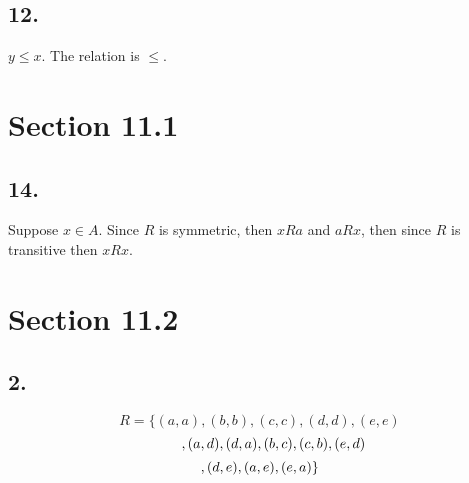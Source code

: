 \documentclass[12pt]{article}
\begin{document}
\hfill\vline\hfill
\begin{minipage}[t]{0.45\textwidth}
	
\subsection*{12.}
$ y\leq x $. The relation is $ \leq $.

\section*{Section 11.1}
\subsection*{14.}
Suppose $ x\in A $. Since $ R $ is symmetric, then $ xRa $ and $ aRx $, then since $ R $ is transitive then $ xRx $.

\section*{Section 11.2}
\subsection*{2.}

\[
R=
\{(a,a),(b,b),(c,c),(d,d),(e,e)
\]
\[
\newline\quad\quad,(a,d),(d,a),(b,c),(c,b),(e,d)
\]
\[
\newline,(d,e),(a,e),(e,a)
\}
\]

\end{minipage}
\pagebreak


\end{document}

